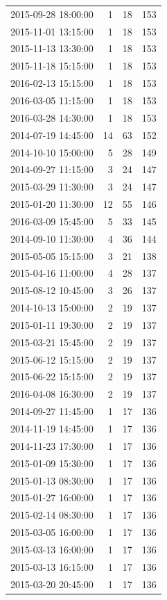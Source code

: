 \begin{tabular}{lrrr}
2015-09-28 18:00:00 & 1 & 18 & 153 \\
2015-11-01 13:15:00 & 1 & 18 & 153 \\
2015-11-13 13:30:00 & 1 & 18 & 153 \\
2015-11-18 15:15:00 & 1 & 18 & 153 \\
2016-02-13 15:15:00 & 1 & 18 & 153 \\
2016-03-05 11:15:00 & 1 & 18 & 153 \\
2016-03-28 14:30:00 & 1 & 18 & 153 \\
2014-07-19 14:45:00 & 14 & 63 & 152 \\
2014-10-10 15:00:00 & 5 & 28 & 149 \\
2014-09-27 11:15:00 & 3 & 24 & 147 \\
2015-03-29 11:30:00 & 3 & 24 & 147 \\
2015-01-20 11:30:00 & 12 & 55 & 146 \\
2016-03-09 15:45:00 & 5 & 33 & 145 \\
2014-09-10 11:30:00 & 4 & 36 & 144 \\
2015-05-05 15:15:00 & 3 & 21 & 138 \\
2015-04-16 11:00:00 & 4 & 28 & 137 \\
2015-08-12 10:45:00 & 3 & 26 & 137 \\
2014-10-13 15:00:00 & 2 & 19 & 137 \\
2015-01-11 19:30:00 & 2 & 19 & 137 \\
2015-03-21 15:45:00 & 2 & 19 & 137 \\
2015-06-12 15:15:00 & 2 & 19 & 137 \\
2015-06-22 15:15:00 & 2 & 19 & 137 \\
2016-04-08 16:30:00 & 2 & 19 & 137 \\
2014-09-27 11:45:00 & 1 & 17 & 136 \\
2014-11-19 14:45:00 & 1 & 17 & 136 \\
2014-11-23 17:30:00 & 1 & 17 & 136 \\
2015-01-09 15:30:00 & 1 & 17 & 136 \\
2015-01-13 08:30:00 & 1 & 17 & 136 \\
2015-01-27 16:00:00 & 1 & 17 & 136 \\
2015-02-14 08:30:00 & 1 & 17 & 136 \\
2015-03-05 16:00:00 & 1 & 17 & 136 \\
2015-03-13 16:00:00 & 1 & 17 & 136 \\
2015-03-13 16:15:00 & 1 & 17 & 136 \\
2015-03-20 20:45:00 & 1 & 17 & 136 \\

\end{tabular}
